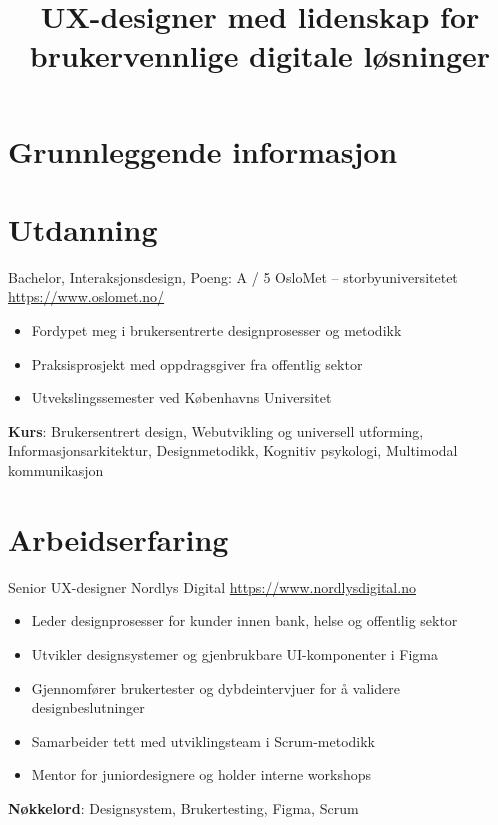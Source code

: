 \documentclass[a4paper, serif, 10pt]{moderncv}
\title{UX-designer med lidenskap for brukervennlige digitale løsninger}
\begin{document}
\maketitle

\section{Grunnleggende informasjon}

\section{Utdanning}

        {Bachelor, Interaksjonsdesign, Poeng: A / 5}
        {OsloMet – storbyuniversitetet}
        {\url{https://www.oslomet.no/}}
        {}
        {\begin{itemize}
\item Fordypet meg i brukersentrerte designprosesser og metodikk
\item Praksisprosjekt med oppdragsgiver fra offentlig sektor
\item Utvekslingssemester ved Københavns Universitet
\end{itemize}
\textbf{Kurs}: Brukersentrert design, Webutvikling og universell utforming, Informasjonsarkitektur, Designmetodikk, Kognitiv psykologi, Multimodal kommunikasjon}
\section{Arbeidserfaring}

        {Senior UX-designer}
        {Nordlys Digital}
        {\url{https://www.nordlysdigital.no}}
        {}
        {\begin{itemize}
\item Leder designprosesser for kunder innen bank, helse og offentlig sektor
\item Utvikler designsystemer og gjenbrukbare UI-komponenter i Figma
\item Gjennomfører brukertester og dybdeintervjuer for å validere designbeslutninger
\item Samarbeider tett med utviklingsteam i Scrum-metodikk
\item Mentor for juniordesignere og holder interne workshops
\end{itemize}
\textbf{Nøkkelord}: Designsystem, Brukertesting, Figma, Scrum}
\end{document}
